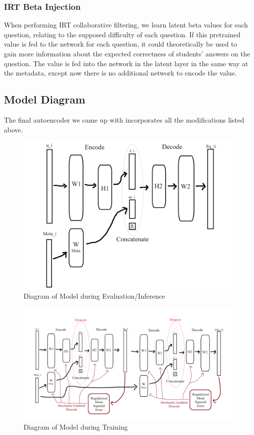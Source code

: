 \documentclass{article}
\begin{document}
\subsubsection{IRT Beta Injection}
When performing IRT collaborative filtering, we learn latent beta values for each question, relating to the supposed difficulty of each question. If this pretrained value is fed to the network for each question, it could theoretically be used to gain more information about the expected correctness of students' answers on the question. The value is fed into the network in the latent layer in the same way at the metadata, except now there is no additional network to encode the value.
\subsection{Model Diagram}
The final autoencoder we came up with incorporates all the modifications listed above.
\begin{figure}[H]
\centering
\includegraphics[width=1
\linewidth]{figures/model.png}
\caption{Diagram of Model during Evaluation/Inference}
\label{fig:enter-label}
\end{figure}

\begin{figure}[H]
    \includegraphics[width=\textwidth,height=\textheight,keepaspectratio]{figures/model during training.png}
    \caption{Diagram of Model during Training}
    \label{fig:enter-label}
\end{figure}
\newpage
\end{document}
